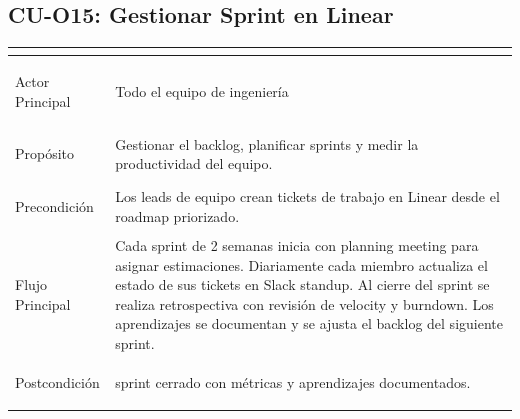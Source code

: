 ﻿\documentclass[11pt, letterpaper]{article}
\begin{document}
\subsection{CU-O15: Gestionar Sprint en Linear}



\begin{table}[H]

\footnotesize

\begin{tabularx}{\linewidth}{>{\bfseries\raggedright\arraybackslash}p{2.5cm} >{\raggedright\arraybackslash}X}

\toprule

\multicolumn{2}{l}{\textbf{CU-O15: Gestionar Sprint en Linear} \hfill \textit{Prioridad: 8 \quad | \quad Operativo}} \\

\midrule

Actor Principal & Todo el equipo de ingeniería \\

\midrule

Propósito & Gestionar el backlog, planificar sprints y medir la productividad del equipo. \\

\midrule

Precondición & Los leads de equipo crean tickets de trabajo en Linear desde el roadmap priorizado. \\

\midrule

Flujo Principal & Cada sprint de 2 semanas inicia con planning meeting para asignar estimaciones. Diariamente cada miembro actualiza el estado de sus tickets en Slack standup. Al cierre del sprint se realiza retrospectiva con revisión de velocity y burndown. Los aprendizajes se documentan y se ajusta el backlog del siguiente sprint. \\

\midrule

Postcondición & sprint cerrado con métricas y aprendizajes documentados. \\

\bottomrule

\end{tabularx}

\end{table}



\vspace{2pt}
\end{document}
